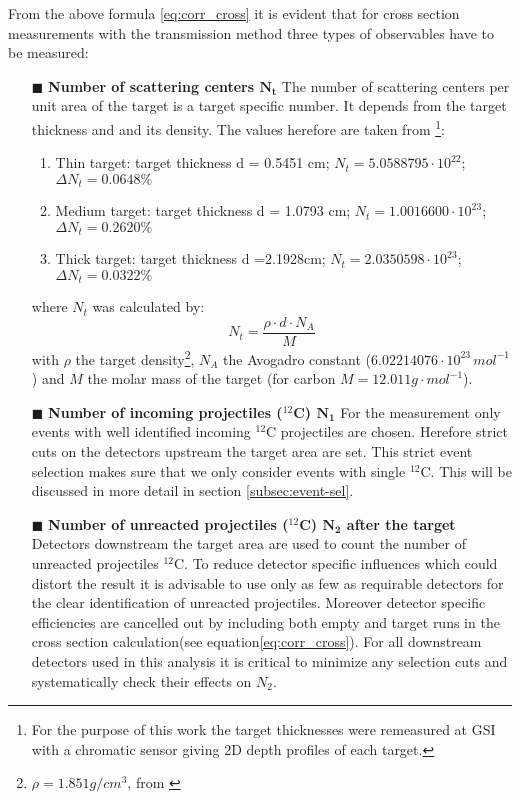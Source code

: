 From the above formula \ref{eq:corr_cross} it is evident that for cross section measurements with the transmission method three types of observables have to be measured:\newline
\begin{enumerate}
\item[$\blacksquare$] \textbf{Number of scattering centers $\mathbf{N_t}$}\newline
The number of scattering centers per unit area of the target is a target specific number. It depends from the target thickness and and its density. The values herefore are taken from \cite{ponnath2023precise}\footnote{For the purpose of this work the target thicknesses were remeasured at GSI with a chromatic sensor giving 2D depth profiles of each target.}:
\begin{enumerate}
\item Thin target:\newline 
target thickness d = 0.5451 cm; $N_t = 5.0588795\cdot 10^{22}$; $\Delta N_t = 0.0648\%$
\item Medium target:\newline
target thickness d = 1.0793 cm; $N_t = 1.0016600\cdot 10^{23}$; $\Delta N_t = 0.2620\%$
\item Thick target:\newline
target thickness d =2.1928cm; $N_t = 2.0350598\cdot 10^{23}$; $\Delta N_t = 0.0322\%$
\end{enumerate} 
where $N_t$ was calculated by:
\begin{equation}
N_t = \frac{\rho \cdot d \cdot N_A}{M}
\end{equation}
with $\rho$ the target density\footnote{$\rho = 1.851 g/cm^{3}$, from \cite{ponnath2023precise}}, $N_A$ the Avogadro constant ($6.02214076\cdot10^{23}\,mol^{-1}$) and $M$ the molar mass of the target (for carbon $M = 12.011g \cdot mol^{-1}$).
\item[$\blacksquare$] \textbf{Number of incoming projectiles ($^{12}$C) $\mathbf{N_1}$}\newline
For the measurement only events with well identified incoming $^{12}$C projectiles are chosen. Herefore strict cuts on the detectors upstream the target area are set. This strict event selection makes sure that we only consider events with single $^{12}$C. This will be discussed in more detail in section \ref{subsec:event-sel}.  %
\item[$\blacksquare$] \textbf{Number of unreacted projectiles ($^{12}$C) $\mathbf{N_2}$ after the target}\newline
Detectors downstream the target area are used to count the number of unreacted projectiles $^{12}$C. To reduce detector specific influences which could distort the result it is advisable to use only as few as requirable detectors for the clear identification of unreacted projectiles. Moreover detector specific efficiencies are cancelled out by including both empty and target runs in the cross section calculation(see equation\ref{eq:corr_cross}). For all downstream detectors used in this analysis it is critical to minimize any selection cuts and systematically check their effects on $N_2$.
\end{enumerate}
